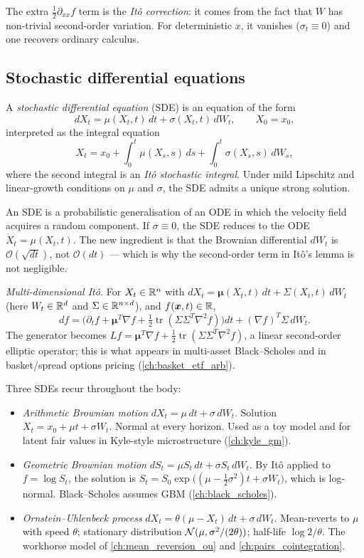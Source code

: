 The extra $\tfrac{1}{2}\partial_{xx} f$ term is the \emph{It\^o
correction}: it comes from the fact that $W$ has non-trivial
second-order variation. For deterministic $x$, it vanishes
($\sigma_t \equiv 0$) and one recovers ordinary calculus.

\subsection{Stochastic differential equations}

A \emph{stochastic differential equation} (SDE) is an equation of the
form
\[
dX_t = \mu(X_t, t)\, dt + \sigma(X_t, t)\, dW_t, \qquad X_0 = x_0,
\]
interpreted as the integral equation
\[
X_t = x_0 + \int_0^t \mu(X_s, s)\, ds + \int_0^t \sigma(X_s, s)\, dW_s,
\]
where the second integral is an \emph{It\^o stochastic integral}. Under
mild Lipschitz and linear-growth conditions on $\mu$ and $\sigma$, the
SDE admits a unique strong solution.

An SDE is a probabilistic generalisation of an ODE in which the
velocity field acquires a random component. If $\sigma \equiv 0$, the
SDE reduces to the ODE $\dot X_t = \mu(X_t, t)$. The new ingredient is
that the Brownian differential $dW_t$ is $\mathcal{O}(\sqrt{dt})$, not
$\mathcal{O}(dt)$ --- which is why the second-order term in It\^o's
lemma is not negligible.

\emph{Multi-dimensional It\^o.} For $X_t \in \mathbb{R}^n$ with
$dX_t = \bm{\mu}(X_t, t)\, dt + \Sigma(X_t, t)\, dW_t$ (here
$W_t \in \mathbb{R}^d$ and $\Sigma \in \mathbb{R}^{n\times d}$), and $f(\bm{x}, t) \in \mathbb{R}$,
\[
df = \Big(\partial_t f + \bm{\mu}^T \nabla f
   + \tfrac{1}{2}\operatorname{tr}(\Sigma \Sigma^T \nabla^2 f)\Big) dt
   + (\nabla f)^T \Sigma\, dW_t.
\]
The generator becomes
$L f = \bm{\mu}^T \nabla f + \tfrac{1}{2}\operatorname{tr}(\Sigma\Sigma^T \nabla^2 f)$,
a linear second-order elliptic operator; this is what appears in
multi-asset Black--Scholes and in basket/spread options pricing
(\cref{ch:basket_etf_arb}).

Three SDEs recur throughout the body:
\begin{itemize}
  \item \emph{Arithmetic Brownian motion} $dX_t = \mu\, dt + \sigma\, dW_t$.
        Solution $X_t = x_0 + \mu t + \sigma W_t$. Normal at every
        horizon. Used as a toy model and for latent fair values in
        Kyle-style microstructure (\cref{ch:kyle_gm}).
  \item \emph{Geometric Brownian motion} $dS_t = \mu S_t\, dt + \sigma S_t\, dW_t$.
        By It\^o applied to $f = \log S_t$, the solution is
        $S_t = S_0 \exp\!\big((\mu - \tfrac{1}{2}\sigma^2)t + \sigma W_t\big)$,
        which is log-normal. Black--Scholes assumes GBM
        (\cref{ch:black_scholes}).
  \item \emph{Ornstein--Uhlenbeck process} $dX_t = \theta(\mu - X_t)\,dt + \sigma\,dW_t$.
        Mean-reverts to $\mu$ with speed $\theta$; stationary
        distribution $\mathcal{N}(\mu, \sigma^2/(2\theta))$; half-life
        $\log 2 / \theta$. The workhorse model of
        \cref{ch:mean_reversion_ou} and
        \cref{ch:pairs_cointegration}.
\end{itemize}

